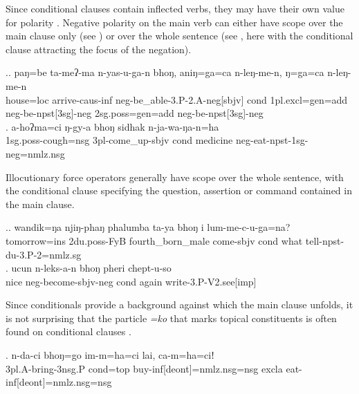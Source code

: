 Since conditional clauses contain inflected verbs, they may have their own value for polarity \Next[a]. Negative polarity  on the main verb can either have  scope over the main clause only (see \Next[a]) or over the whole sentence (see \Next[b], here with the conditional clause attracting the focus of the negation).

\ex.\ag.	paŋ=be ta-meʔ-ma n-yas-u-ga-n bhoŋ, aniŋ=ga=ca n-leŋ-me-n, ŋ=ga=ca n-leŋ-me-n\\
			house={\sc loc} arrive{\sc -caus-inf} {\sc neg-}be\_able{\sc -3.P-2.A-neg[sbjv]} {\sc cond}  {\sc 1pl.excl=gen=add} 
			{\sc neg-}be{\sc -npst[3sg]-neg} {\sc 2sg.poss=gen=add}  {\sc neg-}be{\sc -npst[3sg]-neg}\\
			 
	\bg.	a-hoʔma=ci ŋ-gy-a bhoŋ sidhak n-ja-wa-ŋa-n=ha\\ %
			{\sc 1sg.poss-}cough={\sc nsg}  {\sc 3pl-}come\_up{\sc -sbjv} {\sc cond} medicine {\sc neg-}eat{\sc -npst-1sg-neg=nmlz.nsg}\\ %

			
Illocutionary force operators generally have scope over the whole sentence, with the conditional clause specifying the question, assertion or command contained in the main clause. 

\ex.\ag. wandik=ŋa njiŋ-phaŋ  phalumba            ta-ya             bhoŋ i    lum-me-c-u-ga=na? \\
tomorrow{\sc =ins} {\sc 2du.poss-}FyB fourth\_born\_male come{\sc [3sg]-sbjv} {\sc cond} what tell{\sc -npst-du-3.P-2=nmlz.sg}\\
 
\bg. ucun n-leks-a-n bhoŋ pheri chept-u-so\\
nice {\sc neg-}become{\sc -sbjv-neg} {\sc cond} again write{\sc -3.P-V2.see[imp]}\\


Since conditionals provide a background against which the main clause unfolds, it is not surprising that the particle \emph{=ko} that marks topical constituents is often found on conditional clauses \Next.

\exg. n-da-ci      bhoŋ=go     im-m=ha=ci   lai,  ca-m=ha=ciǃ\\
{\sc 3pl.A-}bring{\sc -3nsg.P} {\sc cond=top} buy{\sc -inf[deont]=nmlz.nsg=nsg}  {\sc excla} eat{\sc -inf[deont]=nmlz.nsg=nsg}\\
 

